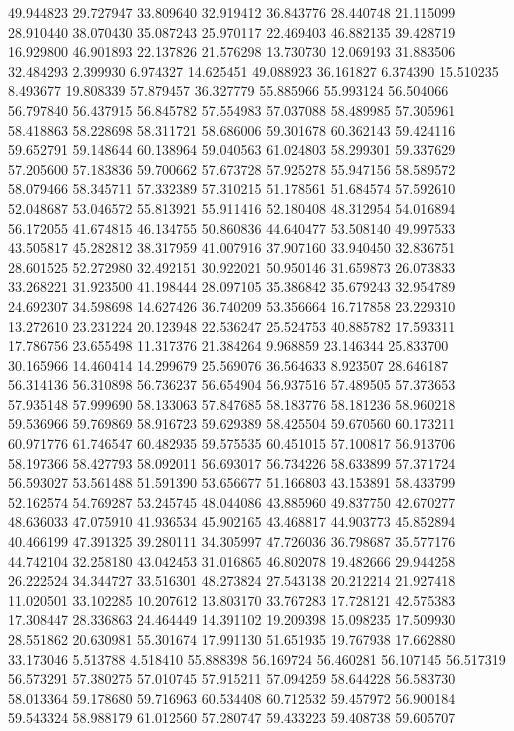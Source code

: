 49.944823
29.727947
33.809640
32.919412
36.843776
28.440748
21.115099
28.910440
38.070430
35.087243
25.970117
22.469403
46.882135
39.428719
16.929800
46.901893
22.137826
21.576298
13.730730
12.069193
31.883506
32.484293
2.399930
6.974327
14.625451
49.088923
36.161827
6.374390
15.510235
8.493677
19.808339
57.879457
36.327779
55.885966
55.993124
56.504066
56.797840
56.437915
56.845782
57.554983
57.037088
58.489985
57.305961
58.418863
58.228698
58.311721
58.686006
59.301678
60.362143
59.424116
59.652791
59.148644
60.138964
59.040563
61.024803
58.299301
59.337629
57.205600
57.183836
59.700662
57.673728
57.925278
55.947156
58.589572
58.079466
58.345711
57.332389
57.310215
51.178561
51.684574
57.592610
52.048687
53.046572
55.813921
55.911416
52.180408
48.312954
54.016894
56.172055
41.674815
46.134755
50.860836
44.640477
53.508140
49.997533
43.505817
45.282812
38.317959
41.007916
37.907160
33.940450
32.836751
28.601525
52.272980
32.492151
30.922021
50.950146
31.659873
26.073833
33.268221
31.923500
41.198444
28.097105
35.386842
35.679243
32.954789
24.692307
34.598698
14.627426
36.740209
53.356664
16.717858
23.229310
13.272610
23.231224
20.123948
22.536247
25.524753
40.885782
17.593311
17.786756
23.655498
11.317376
21.384264
9.968859
23.146344
25.833700
30.165966
14.460414
14.299679
25.569076
36.564633
8.923507
28.646187
56.314136
56.310898
56.736237
56.654904
56.937516
57.489505
57.373653
57.935148
57.999690
58.133063
57.847685
58.183776
58.181236
58.960218
59.536966
59.769869
58.916723
59.629389
58.425504
59.670560
60.173211
60.971776
61.746547
60.482935
59.575535
60.451015
57.100817
56.913706
58.197366
58.427793
58.092011
56.693017
56.734226
58.633899
57.371724
56.593027
53.561488
51.591390
53.656677
51.166803
43.153891
58.433799
52.162574
54.769287
53.245745
48.044086
43.885960
49.837750
42.670277
48.636033
47.075910
41.936534
45.902165
43.468817
44.903773
45.852894
40.466199
47.391325
39.280111
34.305997
47.726036
36.798687
35.577176
44.742104
32.258180
43.042453
31.016865
46.802078
19.482666
29.944258
26.222524
34.344727
33.516301
48.273824
27.543138
20.212214
21.927418
11.020501
33.102285
10.207612
13.803170
33.767283
17.728121
42.575383
17.308447
28.336863
24.464449
14.391102
19.209398
15.098235
17.509930
28.551862
20.630981
55.301674
17.991130
51.651935
19.767938
17.662880
33.173046
5.513788
4.518410
55.888398
56.169724
56.460281
56.107145
56.517319
56.573291
57.380275
57.010745
57.915211
57.094259
58.644228
56.583730
58.013364
59.178680
59.716963
60.534408
60.712532
59.457972
56.900184
59.543324
58.988179
61.012560
57.280747
59.433223
59.408738
59.605707
